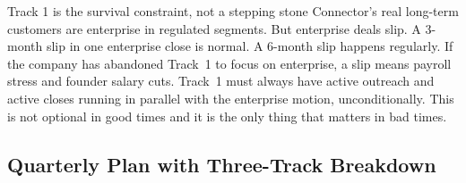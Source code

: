 \begin{warnbox}{Track 1 is the survival constraint, not a stepping stone}
Connector's real long-term customers are enterprise in regulated segments.
But enterprise deals slip. A 3-month slip in one enterprise close is
normal. A 6-month slip happens regularly. If the company has abandoned
Track~1 to focus on enterprise, a slip means payroll stress and founder
salary cuts. Track~1 must always have active outreach and active closes
running in parallel with the enterprise motion, unconditionally. This
is not optional in good times and it is the only thing that matters in
bad times.
\end{warnbox}

\subsection*{Quarterly Plan with Three-Track Breakdown}


